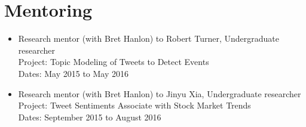 \section*{Mentoring}

\begin{itemize}
\item Research mentor (with Bret Hanlon) to Robert Turner, Undergraduate researcher\\
Project: Topic Modeling of Tweets to Detect Events\\
Dates: May 2015 to May 2016
\item Research mentor (with Bret Hanlon) to Jinyu Xia, Undergraduate researcher\\
Project: Tweet Sentiments Associate with Stock Market Trends\\
Dates: September 2015 to August 2016
\end{itemize}
